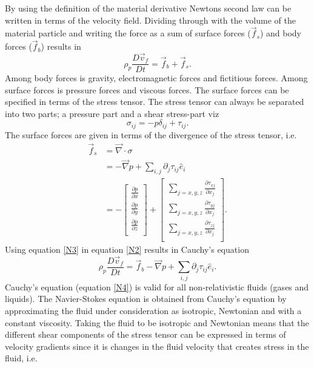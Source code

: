 By using the definition of the material derivative Newtons second law can be written in terms of the velocity field. Dividing through with the volume of the material particle and writing the force as a sum of surface forces ($\vec{f}_{s}$) and body forces ($\vec{f}_{b}$) results in
\begin{equation}
	\rho_p\frac{D\vec{v}_f}{Dt}=\vec{f}_{b}+\vec{f}_{s}.
	\label{N2}
\end{equation} 
Among body forces is gravity, electromagnetic forces and fictitious forces. Among surface forces is pressure forces and viscous forces. The surface forces can be specified in terms of the stress tensor. The stress tensor can always be separated into two parts; a pressure part and a shear stress-part viz
\begin{equation}
	\sigma_{ij}=-p\delta_{ij}+\tau_{ij}.
\end{equation}  
The surface forces are given in terms of the divergence of the stress tensor,  i.e.
\begin{equation}
	\begin{split}
		\vec{f}_s&=\vec{\nabla}\cdot \sigma\\
		&=-\vec{\nabla}p+\sum_{i,j}\partial_j \tau_{ij} \hat{e}_i\\
		&=-\begin{bmatrix}
			\frac{\partial p}{\partial x}\\
			\frac{\partial p}{\partial y}\\
			\frac{\partial p}{\partial z}\\
		\end{bmatrix}+\begin{bmatrix}
			\sum_{j=x,y,z} \frac{\partial \tau_{xj}}{\partial x_j}\\
			\sum_{j=x,y,z} \frac{\partial \tau_{yj}}{\partial x_j}\\
			\sum_{j=x,y,z} \frac{\partial \tau_{zj}}{\partial x_j}\\
		\end{bmatrix}.
	\end{split}
	\label{N3}
\end{equation} 
Using equation \eqref{N3} in equation \eqref{N2} results in Cauchy's equation
\begin{equation}
	\rho_p\frac{D\vec{v}_f}{Dt}=\vec{f}_{b}-\vec{\nabla}p+\sum_{i,j}\partial_j \tau_{ij} \hat{e}_i.
	\label{N4}
\end{equation} 
Cauchy's equation (equation \eqref{N4}) is valid for all non-relativistic fluids (gases and liquids). The Navier-Stokes equation is obtained from Cauchy's equation by approximating the fluid under consideration as isotropic, Newtonian and with a constant viscosity. Taking the fluid to be isotropic and Newtonian means that the different shear components of the stress tensor can be expressed in terms of velocity gradients since it is changes in the fluid velocity that creates stress in the fluid,  i.e.
